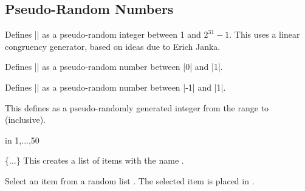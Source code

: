 \subsection{Pseudo-Random Numbers}

\label{pgfmath-random}


\begin{command}{\pgfmathgeneratepseudorandomnumber}
	Defines |\pgfmathresult| as a pseudo-random integer between 1 and 
	$2^{31}-1$. This uses a linear congruency generator, based on ideas
	due to Erich Janka.
\end{command}

\begin{command}{\pgfmathrnd}
	Defines |\pgfmathresult| as a pseudo-random number between |0| and |1|.
\end{command}

\begin{command}{\pgfmathrand}
	Defines |\pgfmathresult| as a pseudo-random number between |-1| and |1|.
\end{command}

\begin{command}{\pgfmathrandominteger{}}
	This defines  as a pseudo-randomly generated integer from 
	the range  to  (inclusive).
	
\begin{codeexample}[]
\begin{pgfpicture}
   \foreach \x in {1,...,50}{
      \color{blue!40!white}
   }	  
\end{pgfpicture}
\end{codeexample}
\end{command}

\begin{command}{\pgfmathdeclarerandomlist{}\{...\}}
	This creates a list of items with the name .
\end{command}

\begin{command}{\pgfmathrandomitem{}}
	Select an item from a random list . The
	selected item is placed in .
\end{command}

